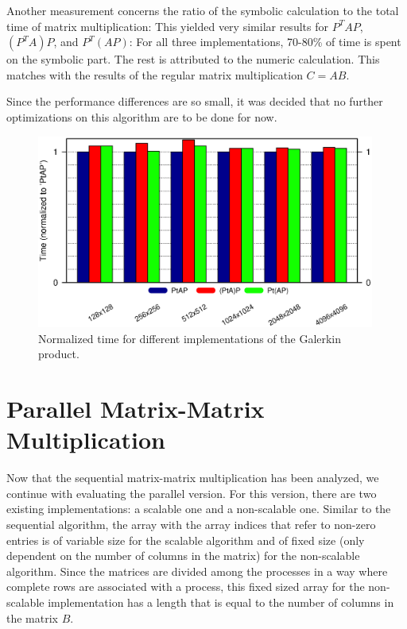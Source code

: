Another measurement concerns the ratio of the symbolic calculation to the total time of matrix multiplication: This yielded very similar results for $P^TAP$, $(P^TA)P$, and $P^T(AP)$: For all three implementations, 70-80\% of time is spent on the symbolic part. The rest is attributed to the numeric calculation. This matches with the results of the regular matrix multiplication $C = AB$.
 
Since the performance differences are so small, it was decided that no further optimizations on this algorithm are to be done for now. 



\begin{figure}[tbp]
	\centering
	\includegraphics[width=0.99\textwidth,  trim={0 2.cm 0 6cm},clip]{ex2_PtAP}
	\caption{Normalized time for different implementations of the Galerkin product.} 
	\label{fig:ex2_ptap}
\end{figure}

\section{Parallel Matrix-Matrix Multiplication}
Now that the sequential matrix-matrix multiplication has been analyzed, we continue with evaluating the parallel version. For this version, there are two existing implementations: a scalable one and a non-scalable one. Similar to the sequential algorithm, the array with the array indices that refer to non-zero entries is of variable size for the scalable algorithm and of fixed size (only dependent on the number of columns in the matrix) for the non-scalable algorithm. Since the matrices are divided among the processes in a way where complete rows are  associated with a process, this fixed sized array for the non-scalable implementation has a length that is equal to the number of columns in the matrix $B$. 

